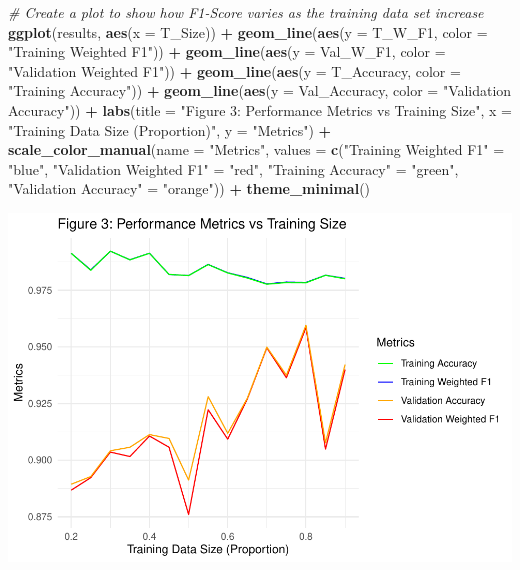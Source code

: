 \documentclass[
]{article}
\newenvironment{Shaded}{\begin{snugshade}}{\end{snugshade}}
\newcommand{\AttributeTok}[1]{\textcolor[rgb]{0.13,0.29,0.53}{#1}}
\newcommand{\CommentTok}[1]{\textcolor[rgb]{0.56,0.35,0.01}{\textit{#1}}}
\newcommand{\FunctionTok}[1]{\textcolor[rgb]{0.13,0.29,0.53}{\textbf{#1}}}
\newcommand{\NormalTok}[1]{#1}
\newcommand{\OtherTok}[1]{\textcolor[rgb]{0.56,0.35,0.01}{#1}}
\newcommand{\SpecialCharTok}[1]{\textcolor[rgb]{0.81,0.36,0.00}{\textbf{#1}}}
\newcommand{\StringTok}[1]{\textcolor[rgb]{0.31,0.60,0.02}{#1}}
\begin{document}
\begin{Shaded}
\begin{Highlighting}[]
\CommentTok{\# Create a plot to show how F1{-}Score varies as the training data set increase}
\FunctionTok{ggplot}\NormalTok{(results, }\FunctionTok{aes}\NormalTok{(}\AttributeTok{x =}\NormalTok{ T\_Size)) }\SpecialCharTok{+}
  \FunctionTok{geom\_line}\NormalTok{(}\FunctionTok{aes}\NormalTok{(}\AttributeTok{y =}\NormalTok{ T\_W\_F1, }\AttributeTok{color =} \StringTok{"Training Weighted F1"}\NormalTok{)) }\SpecialCharTok{+}
  \FunctionTok{geom\_line}\NormalTok{(}\FunctionTok{aes}\NormalTok{(}\AttributeTok{y =}\NormalTok{ Val\_W\_F1, }\AttributeTok{color =} \StringTok{"Validation Weighted F1"}\NormalTok{)) }\SpecialCharTok{+}
  \FunctionTok{geom\_line}\NormalTok{(}\FunctionTok{aes}\NormalTok{(}\AttributeTok{y =}\NormalTok{ T\_Accuracy, }\AttributeTok{color =} \StringTok{"Training Accuracy"}\NormalTok{)) }\SpecialCharTok{+}
  \FunctionTok{geom\_line}\NormalTok{(}\FunctionTok{aes}\NormalTok{(}\AttributeTok{y =}\NormalTok{ Val\_Accuracy, }\AttributeTok{color =} \StringTok{"Validation Accuracy"}\NormalTok{)) }\SpecialCharTok{+}
  \FunctionTok{labs}\NormalTok{(}\AttributeTok{title =} \StringTok{"Figure 3: Performance Metrics vs Training Size"}\NormalTok{,}
       \AttributeTok{x =} \StringTok{"Training Data Size (Proportion)"}\NormalTok{, }
       \AttributeTok{y =} \StringTok{"Metrics"}\NormalTok{) }\SpecialCharTok{+}
  \FunctionTok{scale\_color\_manual}\NormalTok{(}\AttributeTok{name =} \StringTok{"Metrics"}\NormalTok{, }
                     \AttributeTok{values =} \FunctionTok{c}\NormalTok{(}\StringTok{"Training Weighted F1"} \OtherTok{=} \StringTok{"blue"}\NormalTok{, }
                                \StringTok{"Validation Weighted F1"} \OtherTok{=} \StringTok{"red"}\NormalTok{,}
                                \StringTok{"Training Accuracy"} \OtherTok{=} \StringTok{"green"}\NormalTok{,}
                                \StringTok{"Validation Accuracy"} \OtherTok{=} \StringTok{"orange"}\NormalTok{))  }\SpecialCharTok{+}
  \FunctionTok{theme\_minimal}\NormalTok{()}
\end{Highlighting}
\end{Shaded}

\includegraphics{Code_C_files/figure-latex/Create Plot-1.pdf}
\end{document}
